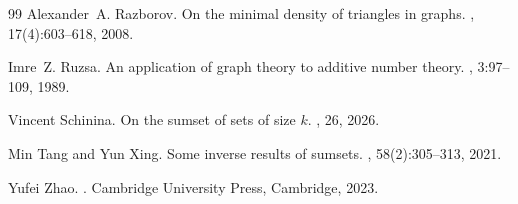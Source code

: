 \documentclass[10pt,a4paper]{article}
\theoremstyle{definition}
\theoremstyle{remark}
\numberwithin{equation}{section}
\numberwithin{theorem}{section}
\begin{document}
\begin{thebibliography}{99}
Alexander~A. Razborov.
\newblock On the minimal density of triangles in graphs.
, 17(4):603--618, 2008.

Imre~Z. Ruzsa.
\newblock An application of graph theory to additive number theory.
, 3:97--109, 1989.

Vincent Schinina.
\newblock On the sumset of sets of size $k$.
, 26, 2026.

Min Tang and Yun Xing.
\newblock Some inverse results of sumsets.
, 58(2):305--313, 2021.

Yufei Zhao.
.
\newblock Cambridge University Press, Cambridge, 2023.

\end{thebibliography}
\end{document}
